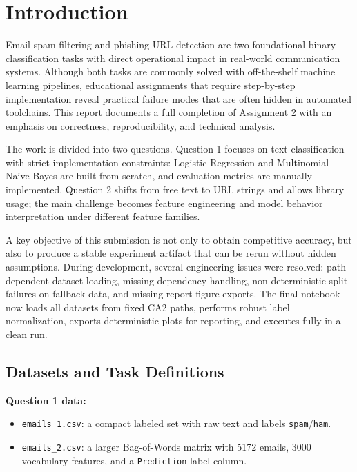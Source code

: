 \section{Introduction}

Email spam filtering and phishing URL detection are two foundational binary classification tasks with direct operational impact in real-world communication systems. Although both tasks are commonly solved with off-the-shelf machine learning pipelines, educational assignments that require step-by-step implementation reveal practical failure modes that are often hidden in automated toolchains. This report documents a full completion of Assignment 2 with an emphasis on correctness, reproducibility, and technical analysis.

The work is divided into two questions. Question 1 focuses on text classification with strict implementation constraints: Logistic Regression and Multinomial Naive Bayes are built from scratch, and evaluation metrics are manually implemented. Question 2 shifts from free text to URL strings and allows library usage; the main challenge becomes feature engineering and model behavior interpretation under different feature families.

A key objective of this submission is not only to obtain competitive accuracy, but also to produce a stable experiment artifact that can be rerun without hidden assumptions. During development, several engineering issues were resolved: path-dependent dataset loading, missing dependency handling, non-deterministic split failures on fallback data, and missing report figure exports. The final notebook now loads all datasets from fixed CA2 paths, performs robust label normalization, exports deterministic plots for reporting, and executes fully in a clean run.

\subsection{Datasets and Task Definitions}

\textbf{Question 1 data:}
\begin{itemize}
    \item \texttt{emails\_1.csv}: a compact labeled set with raw text and labels \texttt{spam}/\texttt{ham}.
    \item \texttt{emails\_2.csv}: a larger Bag-of-Words matrix with 5172 emails, 3000 vocabulary features, and a \texttt{Prediction} label column.
\end{itemize}


